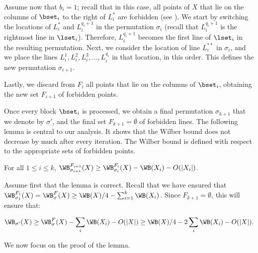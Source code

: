 Assume now that $b_i=1$;  recall that in this case, all points of $X$ that lie on the columns of $\bset_i$ to the right of $L^*_i$ are forbidden  (see ). We start by switching the locations of $L^*_i$ and $L_i^{q_i+1}$ in the permutation $\sigma_i$ (recall that $L_i^{q_i+1}$ is the rightmost line in $\lset_i$). Therefore, $L_i^{q_i+1}$ becomes the first line of $\lset_i$ in the resulting permutation. Next, we
consider the location of line $L^{**}_i$ in $\sigma_i$, and we place the lines $L_i^1,L_i^2,L_i^3,\ldots,L_i^{q_i}$ in that location, in this order. This defines the new permutation $\sigma_{i+1}$.

Lastly, we discard from $F_i$ all points that lie on the columns of $\bset_i$, obtaining the new set $F_{i+1}$ of forbidden points.

Once every block $\bset_i$ is processed, we obtain a final permutation $\sigma_{k+1}$ that we denote by $\sigma'$, and the final set $F_{k+1}=\emptyset$ of forbidden lines. The following lemma is central to our analysis. It shows that the Wilber bound does not decrease by much after every iteration. The Wilber bound is defined with respect to the appropriate sets of forbidden points.


\begin{lemma}\label{lemma: small change}
	For all $1\leq i\leq k$,  $\WB^{F_{i+1}}_{\sigma_{i+1}}(X)\geq \WB^{F_i}_{\sigma_i}(X)-\WB(X_i)-O(|X_i|)$.
\end{lemma}

Assume first that the lemma is correct. Recall that we have ensured that $\WB^{F_1}_{\sigma_1}(X)=\WB^F_{\sigma}(X)\geq \WB(X)/4-\sum_{i=1}^k\WB(X_i)$. Since $F_{k+1}=\emptyset$, this will ensure that:

\[\WB_{\sigma'}(X)\geq \WB^F_{\sigma}(X)-\sum_i\WB(X_i)-O(|X|)\geq \WB(X)/4-2\sum_i \WB(X_i)-O(|X|).\]

We now focus on the proof of the lemma.


